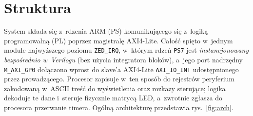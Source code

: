 \documentclass[12pt,a4paper]{article}
\begin{document}
\clearpage
\section{Struktura} %

System składa się z~rdzenia ARM (PS) komunikującego się z~logiką programowalną
(PL) poprzez magistralę AXI4-Lite. Całość spięto w~jednym module
najwyższego poziomu \texttt{ZED\_IRQ}, w~którym rdzeń \texttt{PS7} jest
\emph{instancjonowany bezpośrednio w~Verilogu} (bez użycia integratora bloków),
a~jego port nadrzędny \texttt{M\_AXI\_GP0} dołączono wprost do
slave'a AXI4-Lite \texttt{AXI\_IO\_INT} udostępnionego przez prowadzącego. Procesor zapisuje w~ten sposób do
rejestrów peryferium zakodowaną w~ASCII treść do wyświetlenia oraz rozkazy
sterujące; logika dekoduje te dane i~steruje fizycznie matrycą LED, a~zwrotnie
zgłasza do procesora przerwanie timera. Ogólną architekturę przedstawia
rys.~\ref{fig:arch}.
\end{document}
